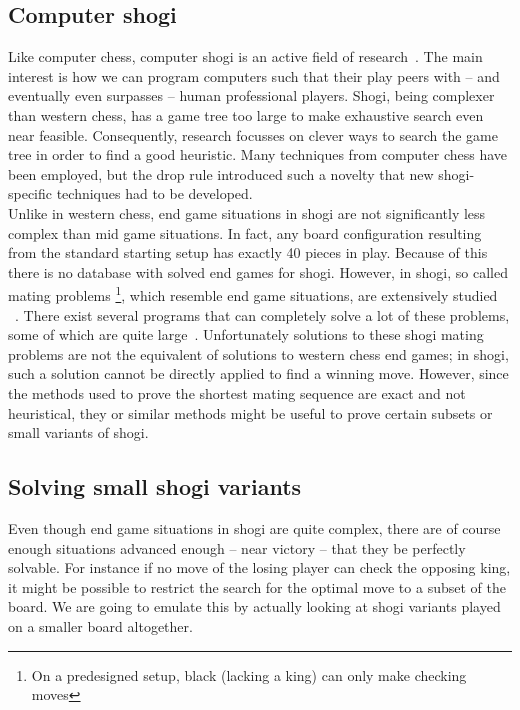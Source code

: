 \documentclass{article}
\begin{document}
\subsection{Computer shogi}
Like computer chess, computer shogi is an active field of research~\cite{iida2002computer}. The main interest is how we can program computers 
such that their play peers with -- and eventually even surpasses -- human professional players. Shogi, being complexer
than western chess, has a game tree too large to make exhaustive search even near feasible. Consequently, research
focusses on clever ways to search the game tree in order to find a good heuristic. Many techniques from computer chess
have been employed, but the drop rule introduced such a novelty that new shogi-specific techniques had to be developed.\\

Unlike in western chess, end game situations
in shogi are not significantly less complex than mid game situations. In fact, any board configuration resulting from the standard
starting setup has exactly 40 pieces in play. Because of this there is no database with solved end games for shogi.
However, in shogi, so called mating problems \footnote{On a predesigned setup, black (lacking a king) can only make checking moves},
which resemble end game situations, are extensively studied ~\cite{grimbergen1999survey}. There exist several
programs that can completely solve a lot of these problems, some of which are quite large~\cite{seo2001pn}. Unfortunately solutions to these shogi
mating problems are not the equivalent of solutions to western chess end games; in shogi, such a solution cannot be directly applied to find a winning move.
However, since the methods used to prove the shortest mating sequence are exact and not heuristical, they or similar methods might be useful to prove
certain subsets or small variants of shogi.\\

\subsection{Solving small shogi variants}
Even though end game situations in shogi are quite complex, there are of course enough situations advanced enough -- near victory -- that they
be perfectly solvable. For instance if no move of the losing player can check the opposing king, it might be possible to restrict the search
for the optimal move to a subset of the board. We are going to emulate this by actually looking at shogi variants played on a smaller board
altogether.
\end{document}
